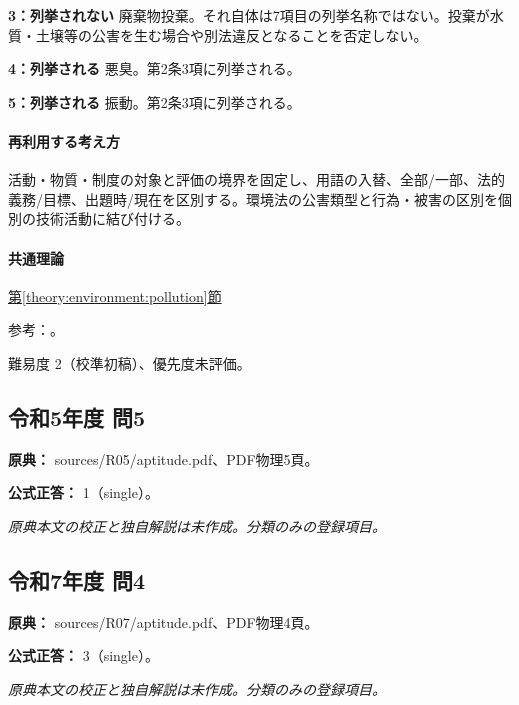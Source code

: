 \noindent\textbf{3：列挙されない} 廃棄物投棄。それ自体は7項目の列挙名称ではない。投棄が水質・土壌等の公害を生む場合や別法違反となることを否定しない。\par

\noindent\textbf{4：列挙される} 悪臭。第2条3項に列挙される。\par

\noindent\textbf{5：列挙される} 振動。第2条3項に列挙される。\par

\paragraph{再利用する考え方} 活動・物質・制度の対象と評価の境界を固定し、用語の入替、全部/一部、法的義務/目標、出題時/現在を区別する。環境法の公害類型と行為・被害の区別を個別の技術活動に結び付ける。

\paragraph{共通理論} \hyperref[theory:environment:pollution]{第\ref*{theory:environment:pollution}節}

\par 参考：\cite{env_pollution}。

\par 難易度 2（校準初稿）、優先度未評価。

\subsection{令和5年度 問5}
\label{q:r05-reg-apt-05}

\noindent\textbf{原典：} sources/R05/aptitude.pdf、PDF物理5頁。

\textbf{公式正答：} 1（single）。

\par\textit{原典本文の校正と独自解説は未作成。分類のみの登録項目。}

\subsection{令和7年度 問4}
\label{q:r07-reg-apt-04}

\noindent\textbf{原典：} sources/R07/aptitude.pdf、PDF物理4頁。

\textbf{公式正答：} 3（single）。

\par\textit{原典本文の校正と独自解説は未作成。分類のみの登録項目。}

